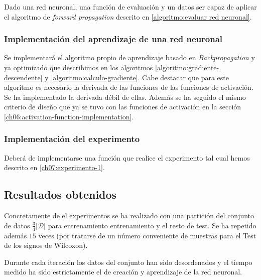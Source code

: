 Dado una red neuronal, una función de evaluación y un datos ser capaz de aplicar el algoritmo de \textit{forward propagation} descrito en \ref{algoritmo:evaluar red neuronal}.

\subsubsection{Implementación del aprendizaje de una red neuronal} 
Se implementará el algoritmo propio de aprendizaje basado en \textit{Backpropagation} y ya optimizado 
que describimos en los algoritmos \ref{algoritmo:gradiente-descendente} y \ref{algoritmo:calculo-gradiente}.
Cabe destacar que para este algoritmo es necesario la derivada de las funciones de las funciones de activación. Se ha implementado la derivada débil de ellas. Además se ha seguido el mismo criterio de diseño que ya se tuvo con las funciones de activación en la sección \ref{ch06:activation-function-implementation}.

\subsubsection{Implementación del experimento} 
Deberá de implementarse una función que realice el 
experimento tal cual hemos descrito en \ref{ch07:experimento-1}.

\subsection{Resultados obtenidos}

Concretamente de el experimentos se ha realizado con 
una partición del conjunto de datos $\frac{3}{4}|\mathcal{D}|$ para entrenamiento entrenamiento 
y el resto de test. Se ha repetido además $15$ veces (por tratarse de un número conveniente de muestras para el Test de los signos de Wilcoxon). 

Durante cada iteración los datos del conjunto han sido desordenados y el tiempo medido ha sido estrictamente el de creación y aprendizaje de la red neuronal. 

